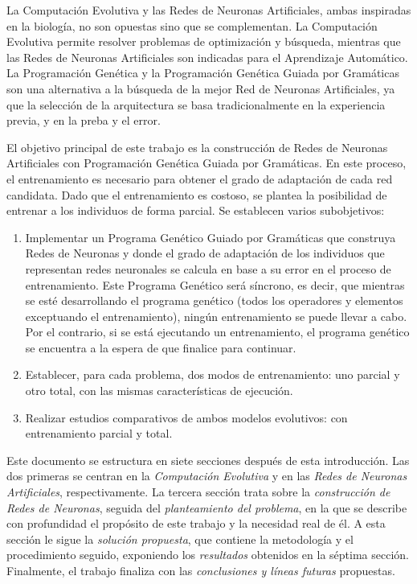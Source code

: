 \documentclass[spanish,a4paper,12pt,twoside]{report}
\begin{document}
  La Computación Evolutiva y las Redes de Neuronas Artificiales, ambas inspiradas en la biología, no son opuestas sino que se complementan. La Computación Evolutiva permite resolver problemas de optimización y búsqueda, mientras que las Redes de Neuronas Artificiales son indicadas para el Aprendizaje Automático. La Programación Genética y la Programación Genética Guiada por Gramáticas son una alternativa a la búsqueda de la mejor Red de Neuronas Artificiales, ya que la selección de la arquitectura se basa tradicionalmente en la experiencia previa, y en la preba y el error. \par
  El objetivo principal de este trabajo es la construcción de Redes de Neuronas Artificiales con Programación Genética Guiada por Gramáticas. En este proceso, el entrenamiento es necesario para obtener el grado de adaptación de cada red candidata. Dado que el entrenamiento es costoso, se plantea la posibilidad de entrenar a los individuos de forma parcial. Se establecen varios subobjetivos:
  \begin{enumerate}
    \item Implementar un Programa Genético Guiado por Gramáticas que construya Redes de Neuronas y donde el grado de adaptación de los individuos que representan redes neuronales se calcula en base a su error en el proceso de entrenamiento. Este Programa Genético será síncrono, es decir, que mientras se esté desarrollando el programa genético (todos los operadores y elementos exceptuando el entrenamiento), ningún entrenamiento se puede llevar a cabo. Por el contrario, si se está ejecutando un entrenamiento, el programa genético se encuentra a la espera de que finalice para continuar.
    \item Establecer, para cada problema, dos modos de entrenamiento: uno parcial y otro total, con las mismas características de ejecución.
    \item Realizar estudios comparativos de ambos modelos evolutivos: con entrenamiento parcial y total.
  \end{enumerate} \par
  Este documento se estructura en siete secciones después de esta introducción. Las dos primeras se centran en la \emph{Computación Evolutiva} y en las \emph{Redes de Neuronas Artificiales}, respectivamente. La tercera sección trata sobre la \emph{construcción de Redes de Neuronas}, seguida del \emph{planteamiento del problema}, en la que se describe con profundidad el propósito de este trabajo y la necesidad real de él. A esta sección le sigue la \emph{solución propuesta}, que contiene la metodología y el procedimiento seguido, exponiendo los \emph{resultados} obtenidos en la séptima sección. Finalmente, el trabajo finaliza con las \emph{conclusiones y líneas futuras} propuestas. \par
  
\end{document}
